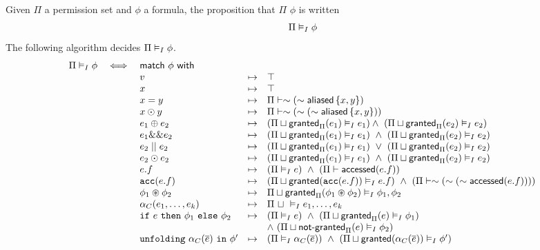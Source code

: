 
Given $\Pi$ a permission set and $\phi$ a formula, the proposition that $\Pi$  $\phi$ is written
$$
\Pi \vDash_I \phi
$$
The following algorithm decides $\Pi \vDash_I \phi$.
\begin{align*}
\begin{array}{rclrl}
\Pi \frames \phi & \iff & \tsf{match} \ \phi \ \tsf{with} && \\
%
%
&& v &\mt&
  \top
\\
&& x &\mt&
  \top
\\
&& x = y &\mt&
  \Pi \entails \pnot (\pnot \aliased\set{x,y})
\\
&& x \odot y &\mt&
  \Pi \entails \pnot (\pnot (\pnot \aliased\set{x,y}))
\\
&& e_1 \oplus e_2 &\mt&
  (\Pi \merge \grantedPi(e_1) \frames e_1) \land \
  (\Pi \merge \grantedPi(e_2) \frames e_2)
\\
&& e_1 \&\& e_2 &\mt&
  (\Pi \merge \grantedPi(e_1) \frames e_1) \ \land \
  (\Pi \merge \grantedPi(e_2) \frames e_2)
\\
&& e_2 \mid\mid e_2 &\mt&
(\Pi \merge \grantedPi(e_1) \frames e_1) \ \lor \
(\Pi \merge \grantedPi(e_2) \frames e_2)
\\
&& e_2 \odot e_2 &\mt&
(\Pi \merge \grantedPi(e_1) \frames e_1) \ \land \
(\Pi \merge \grantedPi(e_2) \frames e_2)
\\
&& e.f &\mt&
  (\Pi \frames e) \ \land \
  (\Pi \entails \accessed(e.f))
\\
&& \cacc(e.f) &\mt&
  (\Pi \merge \granted(\cacc(e.f)) \frames e.f) \ \land \
  (\Pi \entails \pnot (\pnot (\pnot \accessed(e.f))))
\\
&& \phi_1 \cast \phi_2 &\mt&
  \Pi \merge \grantedPi(\phi_1 \cast \phi_2) \frames
  \phi_1, \phi_2
\\
&& \alpha_C(e_1, \dots, e_k) &\mt&
  \Pi \ \merge \ \frames e_1, \dots, e_k
\\
&& \cif \ e \ \cthen \ \phi_1 \ \celse \ \phi_2 &\mt&
  (\Pi \frames e) \ \land \
  (\Pi \merge \grantedPi(e) \frames \phi_1) \\ &&&& \land \
  (\Pi \merge \notgrantedPi(e) \frames \phi_2)
\\
&& \cunfolding \ \alpha_C(\vec{e}) \ \cin \ \phi\p &\mt&
  (\Pi \frames \alpha_C(\vec{e})) \ \land \
  (\Pi \merge \granted(\alpha_C(\vec{e})) \frames \phi\p)
\end{array}
\end{align*}


